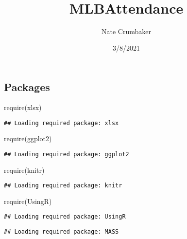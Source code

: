 \documentclass[
]{article}
\title{MLBAttendance}
\author{Nate Crumbaker}
\date{3/8/2021}
\newenvironment{Shaded}{\begin{snugshade}}{\end{snugshade}}
\newcommand{\FunctionTok}[1]{\textcolor[rgb]{0.00,0.00,0.00}{#1}}
\newcommand{\NormalTok}[1]{#1}
\begin{document}
\maketitle

\hypertarget{packages}{%
\subsection{Packages}\label{packages}}

\begin{Shaded}
\begin{Highlighting}[]
\FunctionTok{require}\NormalTok{(xlsx)}
\end{Highlighting}
\end{Shaded}

\begin{verbatim}
## Loading required package: xlsx
\end{verbatim}

\begin{Shaded}
\begin{Highlighting}[]
\FunctionTok{require}\NormalTok{(ggplot2)}
\end{Highlighting}
\end{Shaded}

\begin{verbatim}
## Loading required package: ggplot2
\end{verbatim}

\begin{Shaded}
\begin{Highlighting}[]
\FunctionTok{require}\NormalTok{(knitr)}
\end{Highlighting}
\end{Shaded}

\begin{verbatim}
## Loading required package: knitr
\end{verbatim}

\begin{Shaded}
\begin{Highlighting}[]
\FunctionTok{require}\NormalTok{(UsingR)}
\end{Highlighting}
\end{Shaded}

\begin{verbatim}
## Loading required package: UsingR
\end{verbatim}

\begin{verbatim}
## Loading required package: MASS
\end{verbatim}
\end{document}
